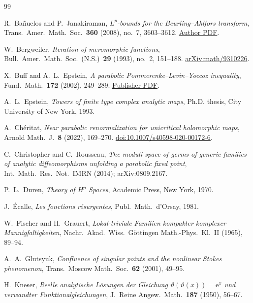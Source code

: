 \documentclass[11pt]{amsart}
\theoremstyle{definition}
\newcommand{\eee}{\mathrm{e}}
\begin{document}
\begin{thebibliography}{99}

R.~Ba\~nuelos and P.~Janakiraman,
\emph{$L^p$-bounds for the Beurling--Ahlfors transform},
Trans.\ Amer.\ Math.\ Soc.\ \textbf{360} (2008), no.~7, 3603--3612.
\href{https://www.math.purdue.edu/~banuelos/Papers/Beur_Ahl.pdf}{Author PDF}.

W.~Bergweiler,
\emph{Iteration of meromorphic functions},
Bull.\ Amer.\ Math.\ Soc.\ (N.S.)\ \textbf{29} (1993), no.~2, 151--188.
\href{https://arxiv.org/abs/math/9310226}{arXiv:math/9310226}.

X.~Buff and A.~L.~Epstein,
\emph{A parabolic Pommerenke--Levin--Yoccoz inequality},
Fund.\ Math.\ \textbf{172} (2002), 249--289.
\href{https://www.impan.pl/shop/en/publication/transaction/download/product/89261}{Publisher PDF}.

A.~L.~Epstein,
\emph{Towers of finite type complex analytic maps},
Ph.D. thesis, City University of New York, 1993.

A.~Ch\'eritat,
\emph{Near parabolic renormalization for unicritical holomorphic maps},
Arnold Math.\ J.\ \textbf{8} (2022), 169--270.
\href{https://doi.org/10.1007/s40598-020-00172-6}{doi:10.1007/s40598-020-00172-6}.

C.~Christopher and C.~Rousseau,
\emph{The moduli space of germs of generic families of analytic
diffeomorphisms unfolding a parabolic fixed point},
Int.\ Math.\ Res.\ Not.\ IMRN (2014); arXiv:0809.2167.

P.~L.~Duren, \emph{Theory of $H^p$ Spaces}, Academic Press, New York, 1970.

J.~\'Ecalle,
\emph{Les fonctions r\'esurgentes}, Publ.\ Math.\ d'Orsay, 1981.

W.~Fischer and H.~Grauert,
\emph{Lokal-triviale Familien kompakter komplexer Mannigfaltigkeiten},
Nachr.\ Akad.\ Wiss.\ G\"ottingen Math.-Phys.\ Kl.\ II (1965), 89--94.

A.~A.~Glutsyuk,
\emph{Confluence of singular points and the nonlinear Stokes phenomenon},
Trans.\ Moscow Math.\ Soc.\ \textbf{62} (2001), 49--95.

H.~Kneser,
\emph{Reelle analytische L\"osungen der Gleichung
$\vartheta(\vartheta(x))=\eee^{x}$ und verwandter Funktionalgleichungen},
J.\ Reine Angew.\ Math.\ \textbf{187} (1950), 56--67.


\end{thebibliography}
\end{document}
